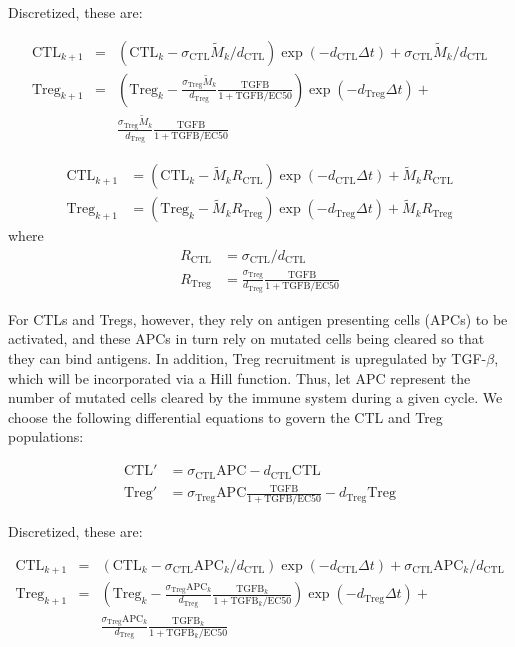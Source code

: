 \documentclass{article}
\begin{document}
Discretized, these are:

\begin{align*}
\text{CTL}_{k+1} & = & \left (\text{CTL}_k-\sigma_{\text{CTL}}\tilde{M}_k/d_{\text{CTL}}\right )\exp(- d_{\text{CTL}}\Delta t) + \sigma_{\text{CTL}}\tilde{M}_k/d_{\text{CTL}}\\
\text{Treg}_{k+1} & = & \left (\text{Treg}_k-\frac{\sigma_{\text{Treg}}\tilde{M}_k}{d_{\text{Treg}}} \frac{\text{TGFB}}{1+\text{TGFB}/\text{EC50}}\right )\exp(-d_{\text{Treg}}\Delta t)+\\
& & \frac{\sigma_{\text{Treg}}\tilde{M}_k}{d_{\text{Treg}}} \frac{\text{TGFB}}{1+\text{TGFB}/\text{EC50}}
\end{align*}

\begin{align*}
\text{CTL}_{k+1} & =\left (\text{CTL}_k-\tilde{M}_kR_{\text{CTL}}\right )\exp(- d_{\text{CTL}}\Delta t) + \tilde{M}_kR_{\text{CTL}}\\
\text{Treg}_{k+1} & =\left (\text{Treg}_k-\tilde{M}_kR_{\text{Treg}}\right )\exp(-d_{\text{Treg}}\Delta t)+\tilde{M}_kR_{\text{Treg}}
\end{align*}
where
\begin{align*}
R_{\text{CTL}} &= \sigma_{\text{CTL}}/d_{\text{CTL}}\\
R_{\text{Treg}} &=\frac{\sigma_{\text{Treg}}}{d_{\text{Treg}}} \frac{\text{TGFB}}{1+\text{TGFB}/\text{EC50}}
\end{align*}

For CTLs and Tregs, however, they rely on antigen presenting cells (APCs) to be activated, and these APCs in turn rely on mutated cells being cleared so that they can bind antigens.
In addition, Treg recruitment is upregulated by TGF-$\beta$, which will be incorporated via a Hill function.
Thus, let $\text{APC}$ represent the number of mutated cells cleared by the immune system during a given cycle.
We choose the following differential equations to govern the CTL and Treg populations:

\begin{align*}
\text{CTL}' & = \sigma_{\text{CTL}}\text{APC} - d_{\text{CTL}}\text{CTL} \\
\text{Treg}' & = \sigma_{\text{Treg}}\text{APC} \frac{\text{TGFB}}{1+\text{TGFB}/\text{EC50}}- d_{\text{Treg}}\text{Treg}
\end{align*}

Discretized, these are:

\begin{align*}
\text{CTL}_{k+1} & = & \left (\text{CTL}_k-\sigma_{\text{CTL}}\text{APC}_k/d_{\text{CTL}}\right )\exp(- d_{\text{CTL}}\Delta t) + \sigma_{\text{CTL}}\text{APC}_k/d_{\text{CTL}}\\
\text{Treg}_{k+1} & = & \left (\text{Treg}_k-\frac{\sigma_{\text{Treg}}\text{APC}_k}{d_{\text{Treg}}} \frac{\text{TGFB}_k}{1+\text{TGFB}_k/\text{EC50}}\right )\exp(-d_{\text{Treg}}\Delta t)+\\
& & \frac{\sigma_{\text{Treg}}\text{APC}_k}{d_{\text{Treg}}} \frac{\text{TGFB}_k}{1+\text{TGFB}_k/\text{EC50}}
\end{align*}
\end{document}
